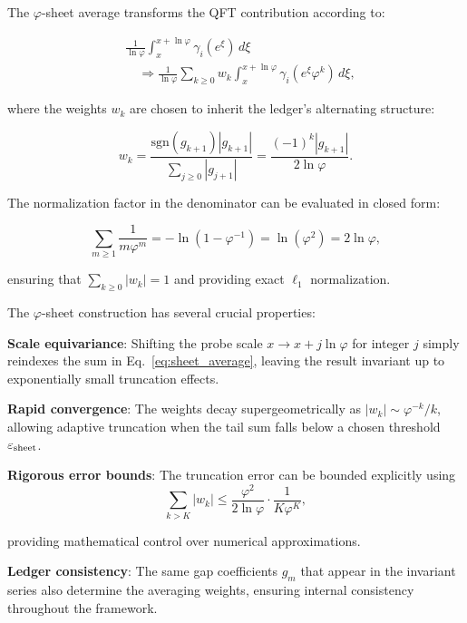\documentclass[%
amsmath,amssymb,
aps,
prb,
floatfix,
twocolumn
]{revtex4-2}
\begin{document}
The $\varphi$-sheet average transforms the QFT contribution according to:

\begin{align}
&\frac{1}{\ln\varphi}\int_{x}^{x+\ln\varphi} \gamma_i(e^\xi) \, d\xi \\
&\quad \Rightarrow \frac{1}{\ln\varphi} \sum_{k \geq 0} w_k \int_{x}^{x+\ln\varphi} \gamma_i(e^\xi \varphi^k) \, d\xi,
\label{eq:sheet_average}
\end{align}

where the weights $w_k$ are chosen to inherit the ledger's alternating structure:

\begin{equation}
w_k = \frac{\text{sgn}(g_{k+1}) |g_{k+1}|}{\sum_{j \geq 0} |g_{j+1}|} = \frac{(-1)^k |g_{k+1}|}{2\ln\varphi}.
\label{eq:sheet_weights}
\end{equation}

The normalization factor in the denominator can be evaluated in closed form:

\begin{equation}
\sum_{m \geq 1} \frac{1}{m \varphi^m} = -\ln(1-\varphi^{-1}) = \ln(\varphi^2) = 2\ln\varphi,
\label{eq:normalization}
\end{equation}

ensuring that $\sum_{k \geq 0} |w_k| = 1$ and providing exact $\ell_1$ normalization.

The $\varphi$-sheet construction has several crucial properties:

\textbf{Scale equivariance}: Shifting the probe scale $x \to x + j\ln\varphi$ for integer $j$ simply reindexes the sum in Eq.~\eqref{eq:sheet_average}, leaving the result invariant up to exponentially small truncation effects.

\textbf{Rapid convergence}: The weights decay supergeometrically as $|w_k| \sim \varphi^{-k}/k$, allowing adaptive truncation when the tail sum falls below a chosen threshold $\varepsilon_{\rm sheet}$.

\textbf{Rigorous error bounds}: The truncation error can be bounded explicitly using
\begin{equation}
\sum_{k > K} |w_k| \leq \frac{\varphi^2}{2\ln\varphi} \cdot \frac{1}{K \varphi^K},
\label{eq:truncation_bound}
\end{equation}

providing mathematical control over numerical approximations.

\textbf{Ledger consistency}: The same gap coefficients $g_m$ that appear in the invariant series also determine the averaging weights, ensuring internal consistency throughout the framework.
\end{document}

